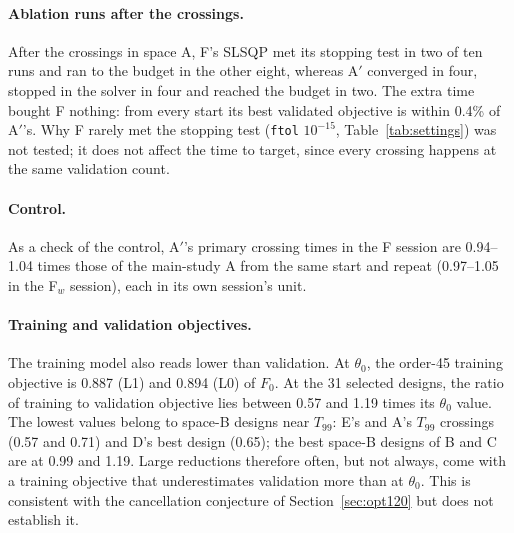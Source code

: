 \documentclass{anvil-paper}
\begin{document}
\paragraph{Ablation runs after the crossings.}
After the crossings in space A, F's SLSQP met its stopping test in two of ten runs and ran to the
budget in the other eight, whereas A$'$ converged in four, stopped in the
solver in four and reached the budget in two. The extra time bought F
nothing: from every start its best validated objective is within 0.4\% of
A$'$'s. Why F rarely met the stopping test (\texttt{ftol} $10^{-15}$,
Table~\ref{tab:settings}) was not tested; it does not affect the time to
target, since every crossing happens at the same validation count.

\paragraph{Control.}
As a check of the control,
A$'$'s primary crossing times in the F session are 0.94--1.04 times those
of the main-study A from the same start and repeat (0.97--1.05 in the
F$_w$ session), each in its own session's unit.

\paragraph{Training and validation objectives.}
The training model also reads lower than validation. At $\theta_0$, the
order-45 training objective is 0.887 (L1) and 0.894 (L0) of $F_0$. At the
31 selected designs, the ratio of training to validation objective lies
between 0.57 and 1.19 times its $\theta_0$ value. The lowest values belong
to space-B designs near $T_{99}$: E's and A's $T_{99}$ crossings (0.57 and
0.71) and D's best design (0.65); the best space-B designs of B and C are at
0.99 and 1.19. Large reductions therefore often, but not always, come with a
training objective that underestimates validation more than at $\theta_0$.
This is consistent with the cancellation conjecture of
Section~\ref{sec:opt120} but does not establish it.
\end{document}
